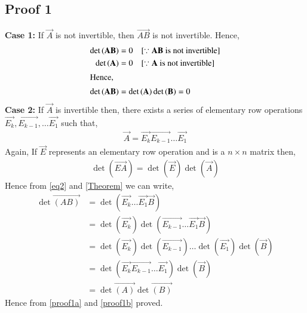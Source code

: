 \documentclass[journal,12pt,twocolumn]{IEEEtran}
\begin{document}
\subsection{Proof 1}
\textbf{Case 1:} If $\vec{A}$ is not invertible, then $\vec{AB}$ is not invertible. Hence,
\begin{align}
\det\vec{(AB)} & = 0 \quad{\text{[$\because \vec{AB}$ is not invertible]}}\\
\det\vec{(A)} & = 0 \quad{\text{[$\because \vec{A}$ is not invertible]}}\\
\intertext{Hence,}
\det\vec{(AB)} &= \det\vec{(A)}\det\vec{(B)} = 0\label{proof1a}
\end{align}
\textbf{Case 2:} If $\vec{A}$ is invertible then, there exists a series of elementary row operations $\vec{E_k},\vec{E_{k-1}},\dots\vec{E_1}$ such that,
\begin{align}
    \vec{A} = \vec{E_k}\vec{E_{k-1}}\dots\vec{E_1}\label{eq2}
\end{align}
Again, If $\vec{E}$ represents an elementary row operation and  is a $n \times n$ matrix then,
\begin{align}
    \det(\vec{EA}) = \det(\vec{E})\det(\vec{A}) \label{Theorem}
\end{align}
Hence from \eqref{eq2} and \eqref{Theorem} we can write,
\begin{align}
\det\vec{(AB)} &= \det(\vec{E_{k}}\dots\vec{E_1}\vec{B})\\
&= \det(\vec{E_k})\det(\vec{E_{k-1}}\dots\vec{E_1}\vec{B})\\
&= \det(\vec{E_k})\det(\vec{E_{k-1}})\dots\det(\vec{E_1})\det(\vec{B})\\
&= \det(\vec{E_k}\vec{E_{k-1}}\dots\vec{E_1})\det(\vec{B})\\
&=\det\vec{(A)}\det\vec{(B)}\label{proof1b}
\end{align}
Hence from \eqref{proof1a} and \eqref{proof1b} proved.
\end{document}
